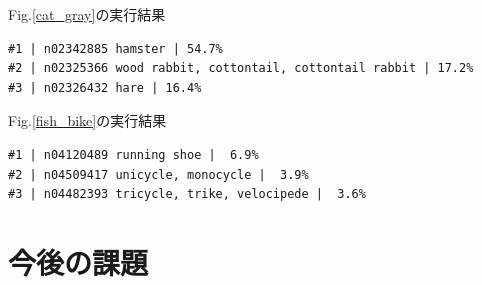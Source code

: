 \documentclass[a4paper,10pt]{jsarticle}
\begin{document}
Fig.\ref{cat_gray}の実行結果
\begin{lstlisting}[basicstyle=\ttfamily\footnotesize, frame=single]
#1 | n02342885 hamster | 54.7%
#2 | n02325366 wood rabbit, cottontail, cottontail rabbit | 17.2%
#3 | n02326432 hare | 16.4%
\end{lstlisting}

Fig.\ref{fish_bike}の実行結果
\begin{lstlisting}[basicstyle=\ttfamily\footnotesize, frame=single]
#1 | n04120489 running shoe |  6.9%
#2 | n04509417 unicycle, monocycle |  3.9%
#3 | n04482393 tricycle, trike, velocipede |  3.6%
\end{lstlisting}

\section{今後の課題}
\end{document}
